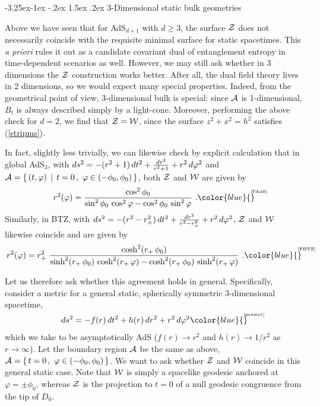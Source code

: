 \documentclass[12pt]{article}
\makeatletter
\renewcommand\subsection{\@startsection{subsection}{2}{\z@}%
                                     {-3.25ex\@plus -1ex \@minus -.2ex}%
                                     {1.5ex \@plus .2ex}%
                                     {\normalfont\bfseries}}
\def\req#1{(\ref{#1})}
\def\ph{\varphi}
\def\CA{{\cal A}}
\def\CW{{\cal W}}
\def\CZ{{\cal Z}}
\def\Label#1{\label{#1}%
{ \color{blue}{\smash{\hbox to0pt{\raise2ex\hbox{\tiny[#1]}\hss}}}}}
\def\Gms{\CW}
\def\Cms{\CZ}
\def\rA{\CA}
\def\set#1{\{ \, #1 \, \}}
\def\st{ \, \mid \, }
\def\pho{\phi_0}
\def\rh{r_+}
\makeatother
\begin{document}
\subsection{3-Dimensional static bulk geometries}

Above we have seen that for AdS$_{d+1}$ with $d\ge3$, the surface $\Cms$ does not necessarily coincide with the requisite minimal surface for static spacetimes.  This {\it a priori} rules it out as a candidate covariant dual of entanglement entropy in time-dependent scenarios as well.
However, we may still ask whether in 3 dimensions the $\Cms$ construction works better.
After all, the dual field theory lives in 2 dimensions, so we would expect many special properties.  Indeed, from the geometrical point of view, 3-dimensional bulk is special: since $\rA$ is 1-dimensional, $B_t$ is always described simply by  a light-cone.
Moreover, performing the above check for $d=2$, we find that $\Cms = \Gms$, since the surface $z^2+x^2=h^2$ satisfies \req{stripms}.

In fact, slightly less trivially, we can likewise check by explicit calculation that in global AdS$_3$, with $ds^2 = - (r^2 + 1) \, dt^2 + {dr^2 \over r^2 + 1} + r^2 \, d\ph^2$ and
$\rA = \set{ (t,\ph) \st t=0 \, , \ \ph \in (-\pho,\pho) }$, both $\Cms$ and $\Gms$ are given by
%
\begin{equation}
r^2 (\ph) = { \cos^2 \pho  \over \sin^2 \pho \, \cos^2 \ph - \cos^2 \pho \, \sin^2 \ph } \ .
\Label{FAdS}
\end{equation}
%
Similarly, in BTZ, with
$ds^2 = - (r^2 - \rh^2) \, dt^2 + {dr^2 \over r^2 - \rh^2} + r^2 \, d\ph^2$,
$\Cms$ and $\Gms$ likewise coincide and are given by
%
\begin{equation}
r^2 (\ph) = \rh^2 \
{ \cosh^2 ( \rh \, \pho)  \over \sinh^2
  ( \rh \, \pho) \, \cosh^2  ( \rh \, \ph) - \cosh^2
   ( \rh \, \pho) \, \sinh^2  ( \rh \, \ph) } \ .
\Label{FBTZ}
\end{equation}
%



Let us therefore ask whether this agreement holds in general.  Specifically, consider a metric for a general static, spherically symmetric 3-dimensional spacetime,
%
\begin{equation}
ds^2 = -f(r) \, dt^2 + h(r) \, dr^2 + r^2 \, d\ph^2
\Label{genmet}
\end{equation}
%
which we take to be asymptotically AdS
($f(r) \to r^2$ and $h(r) \to 1/r^2$ as $r \to \infty$).
Let the boundary region $\rA$ be the same as above,
$\rA = \set{t=0 \, , \ \ph \in (-\pho,\pho) }$.
We want to ask whether $\Cms$ and $\Gms$ coincide in this general static case.
Note that $\Gms$ is simply a spacelike geodesic anchored at $\ph=\pm\pho$, whereas $\Cms$ is the projection to $t=0$ of a null geodesic congruence from the tip of $D_0$.
\end{document}
